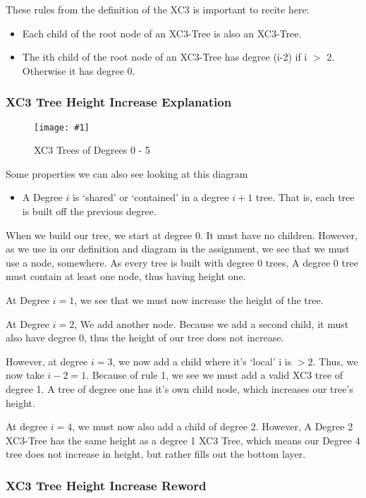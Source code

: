 \documentclass{article}
\newcommand{\figureInsetScaled}[3]
{
    \FloatBarrier{}
    \figureRaw{#1}{#2}{#3}
    \FloatBarrier{}
}
\newcommand{\figureRaw}[3]
{
    \begin{figure}[ht!]
        \centering
        \texttt{[image: \#1]}
        \caption{#2}
    \end{figure}
}
\begin{document}
These rules from the definition of the XC3 is important to recite here:

\begin{itemize}
    \item Each child of the root node of an XC3-Tree is also an XC3-Tree.
    \item The ith child of the root node of an XC3-Tree has degree (i-2) if i $>$ 2. Otherwise it has degree 0.
\end{itemize}

\subsubsection{XC3 Tree Height Increase Explanation}

\figureInsetScaled{images/experiment3/points.png}{XC3 Trees of Degrees 0 - 5}{0.65}

Some properties we can also see looking at this diagram
\begin{itemize}
    \item A Degree $i$ is `shared' or `contained' in a degree $i+1$ tree. That is, each tree is built off the previous degree.
\end{itemize}

When we build our tree, we start at degree 0. It must have no children. However, as we use in our definition and diagram in the assignment, we see that we must use a node, somewhere. As every tree is built with degree 0 trees, A degree 0 tree must contain at least one node, thus having height one.

At Degree $i=1$, we see that we must now increase the height of the tree.

At Degree $i=2$, We add another node. Because we add a second child, it must also have degree 0, thus the height of our tree does not increase.

However, at degree $i=3$, we now add a child where it's `local' i is $>2$. Thus, we now take $i-2 = 1$. Because of rule 1, we see we must add a valid XC3 tree of degree 1. A tree of degree one has it's own child node, which increases our tree's height.

At degree $i=4$, we must now also add a child of degree $2$. However, A Degree 2 XC3-Tree has the same height as a degree 1 XC3 Tree, which means our Degree 4 tree does not increase in height, but rather fills out the bottom layer.

\subsubsection{XC3 Tree Height Increase Reword}
\end{document}
